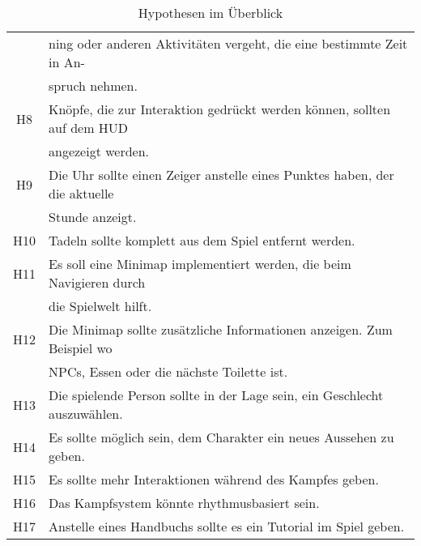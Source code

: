 \begin{center}
\begin{table}[!ht]
\begin{tabular}{ c | l}
                     & ning oder anderen Aktivitäten vergeht, die eine bestimmte Zeit in An-           \\
                     & spruch nehmen.                                                                  \\
         H8          & Knöpfe, die zur Interaktion gedrückt werden können, sollten auf dem HUD         \\
                     & angezeigt werden.                                                               \\
         H9          & Die Uhr sollte einen Zeiger anstelle eines Punktes haben, der die aktuelle      \\
                     & Stunde anzeigt.                                                                 \\
         H10         & Tadeln sollte komplett aus dem Spiel entfernt werden.                           \\
         H11         & Es soll eine Minimap implementiert werden, die beim Navigieren durch            \\
                     & die Spielwelt hilft.                                                            \\
         H12         & Die Minimap sollte zusätzliche Informationen anzeigen. Zum Beispiel wo          \\
                     & NPCs, Essen oder die nächste Toilette ist.                                      \\
         H13         & Die spielende Person sollte in der Lage sein, ein Geschlecht auszuwählen.       \\
         H14         & Es sollte möglich sein, dem Charakter ein neues Aussehen zu geben.              \\
         H15         & Es sollte mehr Interaktionen während des Kampfes geben.                         \\
         H16         & Das Kampfsystem könnte rhythmusbasiert sein.                                    \\
         H17         & Anstelle eines Handbuchs sollte es ein Tutorial im Spiel geben.
      \end{tabular}
      \caption{Hypothesen im Überblick}
      \label{table:hypothesis-overview}
   \end{table}
\end{center}